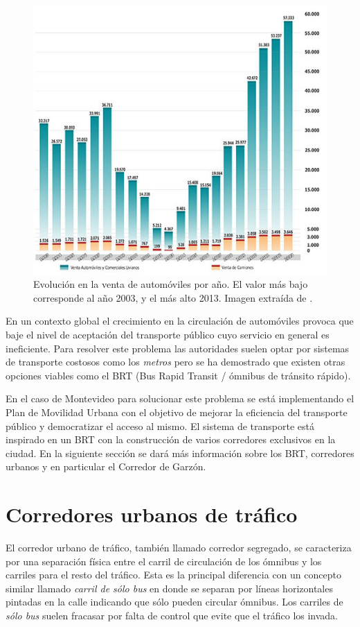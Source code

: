 \begin{figure}[H]
	\centering
	\includegraphics[width=0.9\linewidth]{Figures/ventas_autos}
	\caption{Evolución en la venta de automóviles por año. El valor más bajo corresponde al año 2003, y el más alto 2013. Imagen extraída de \citet{Autoanuario2014}.	
	}
	\label{fig:ventas_autos}
\end{figure}

En un contexto global el crecimiento en la circulación de automóviles provoca que baje el nivel de aceptación del transporte público cuyo servicio en general es ineficiente. Para resolver este problema las autoridades suelen optar por sistemas de transporte costosos como los \emph{metros} pero se ha demostrado que existen otras opciones viables como el BRT (Bus Rapid Transit / ómnibus de tránsito rápido)\citep{BRT_Dial}.

En el caso de Montevideo para solucionar este problema se está implementando el Plan de Movilidad Urbana \citep{PlanMovilidad} con el objetivo de mejorar la eficiencia del transporte público y democratizar el acceso al mismo. El sistema de transporte está inspirado en un BRT con la construcción de varios corredores exclusivos en la ciudad. En la siguiente sección se dará más información sobre los BRT, corredores urbanos y en particular el Corredor de Garzón.

\section{Corredores urbanos de tráfico}
El corredor urbano de tráfico, también llamado corredor segregado, se caracteriza por una separación física entre el carril de circulación de los ómnibus y los carriles para el resto del tráfico. 
Esta es la principal diferencia con un concepto similar llamado \emph{carril de sólo bus} en donde se separan por líneas horizontales pintadas en la calle indicando que sólo pueden circular ómnibus. Los carriles de \emph{sólo bus} suelen fracasar por falta de control que evite que el tráfico los invada. 

